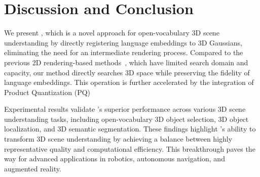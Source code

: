 \section{Discussion and Conclusion}
\label{subsec:6_conclusion}
We present \nickname, which is a novel approach for open-vocabulary 3D scene understanding by directly registering language embeddings to 3D Gaussians, eliminating the need for an intermediate rendering process. 
Compared to the previous 2D rendering-based methods~\cite{langsplat,legaussian}, which have limited search domain and capacity, our method directly searches 3D space while preserving the fidelity of language embeddings.
This operation is further accelerated by the integration of Product Quantization (PQ) 

Experimental results validate \nickname’s superior performance across various 3D scene understanding tasks, including open-vocabulary 3D object selection, 3D object localization, and 3D semantic segmentation.
These findings highlight \nickname's ability to transform 3D scene understanding by achieving a balance between highly representative quality and computational efficiency. 
This breakthrough paves the way for advanced applications in robotics, autonomous navigation, and augmented reality.